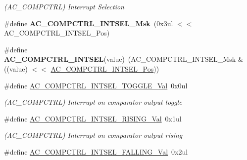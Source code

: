 \begin{DoxyCompactItemize}
\begin{DoxyCompactList}\small\item\em (A\+C\+\_\+\+C\+O\+M\+P\+C\+T\+R\+L) Interrupt Selection \end{DoxyCompactList}\item 
\hypertarget{group___s_a_m_l21___a_c_ga8deca2c36985d9863363ff10aa6b822a}{}\#define {\bfseries A\+C\+\_\+\+C\+O\+M\+P\+C\+T\+R\+L\+\_\+\+I\+N\+T\+S\+E\+L\+\_\+\+Msk}~(0x3ul $<$$<$ A\+C\+\_\+\+C\+O\+M\+P\+C\+T\+R\+L\+\_\+\+I\+N\+T\+S\+E\+L\+\_\+\+Pos)\label{group___s_a_m_l21___a_c_ga8deca2c36985d9863363ff10aa6b822a}

\item 
\hypertarget{group___s_a_m_l21___a_c_ga492036182357ecb681dac2aab9a30d17}{}\#define {\bfseries A\+C\+\_\+\+C\+O\+M\+P\+C\+T\+R\+L\+\_\+\+I\+N\+T\+S\+E\+L}(value)~(A\+C\+\_\+\+C\+O\+M\+P\+C\+T\+R\+L\+\_\+\+I\+N\+T\+S\+E\+L\+\_\+\+Msk \& ((value) $<$$<$ \hyperlink{group___s_a_m_l21___a_c_gaf17b8514f92bb9fa7999607938ab4994}{A\+C\+\_\+\+C\+O\+M\+P\+C\+T\+R\+L\+\_\+\+I\+N\+T\+S\+E\+L\+\_\+\+Pos}))\label{group___s_a_m_l21___a_c_ga492036182357ecb681dac2aab9a30d17}

\item 
\hypertarget{group___s_a_m_l21___a_c_gaea16ed868355094251d2cdf1c1208f98}{}\#define \hyperlink{group___s_a_m_l21___a_c_gaea16ed868355094251d2cdf1c1208f98}{A\+C\+\_\+\+C\+O\+M\+P\+C\+T\+R\+L\+\_\+\+I\+N\+T\+S\+E\+L\+\_\+\+T\+O\+G\+G\+L\+E\+\_\+\+Val}~0x0ul\label{group___s_a_m_l21___a_c_gaea16ed868355094251d2cdf1c1208f98}

\begin{DoxyCompactList}\small\item\em (A\+C\+\_\+\+C\+O\+M\+P\+C\+T\+R\+L) Interrupt on comparator output toggle \end{DoxyCompactList}\item 
\hypertarget{group___s_a_m_l21___a_c_gabeacc3b641a9b183888b92ce7e3361fd}{}\#define \hyperlink{group___s_a_m_l21___a_c_gabeacc3b641a9b183888b92ce7e3361fd}{A\+C\+\_\+\+C\+O\+M\+P\+C\+T\+R\+L\+\_\+\+I\+N\+T\+S\+E\+L\+\_\+\+R\+I\+S\+I\+N\+G\+\_\+\+Val}~0x1ul\label{group___s_a_m_l21___a_c_gabeacc3b641a9b183888b92ce7e3361fd}

\begin{DoxyCompactList}\small\item\em (A\+C\+\_\+\+C\+O\+M\+P\+C\+T\+R\+L) Interrupt on comparator output rising \end{DoxyCompactList}\item 
\hypertarget{group___s_a_m_l21___a_c_ga67a517d1951cfe979b43f56a11cebaf0}{}\#define \hyperlink{group___s_a_m_l21___a_c_ga67a517d1951cfe979b43f56a11cebaf0}{A\+C\+\_\+\+C\+O\+M\+P\+C\+T\+R\+L\+\_\+\+I\+N\+T\+S\+E\+L\+\_\+\+F\+A\+L\+L\+I\+N\+G\+\_\+\+Val}~0x2ul\label{group___s_a_m_l21___a_c_ga67a517d1951cfe979b43f56a11cebaf0}


\end{DoxyCompactItemize}

